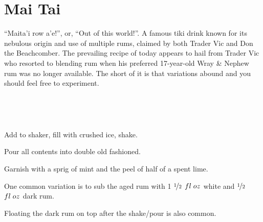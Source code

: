 \section[Mai Tai]{Mai Tai}


\begin{recipestats}[
	servings=1,
	preptime=5 \minute,
	original=\citefield{cocktailSeminars2021}{title} \cite{cocktailSeminars2021},
]
\end{recipestats}


\begin{recipeabstract}
	``Maita'i row a'e!'', or, ``Out of this world!''.
	A famous tiki drink known for its nebulous origin and use of multiple rums, claimed by both Trader Vic and Don the Beachcomber.
	The prevailing recipe of today appears to hail from Trader Vic who resorted to blending rum when his preferred 17-year-old Wray \& Nephew rum was no longer available.
	The short of it is that variations abound and you should feel free to experiment.
\end{recipeabstract}


\begin{ingredientcolumns}
	\begin{ingredientblock}
		\\
	\end{ingredientblock}
	\begin{ingredientblock}
		\ingredient[\onehalf][\fluidounce]{cura\c{c}ao}\\
		\ingredient[\onehalf][\fluidounce]{orgeat}
	\end{ingredientblock}
\end{ingredientcolumns}


\begin{preparation}
\item Add to shaker, fill with crushed ice, shake.
\item Pour all contents into double old fashioned.
\item Garnish with a sprig of mint and the peel of half of a spent lime.
\end{preparation}


\begin{variation}
\item One common variation is to sub the aged rum with 1 $\nicefrac{1}{2}$ $fl\;oz$ white and $\nicefrac{1}{2}$ $fl\;oz$ dark rum.
\item Floating the dark rum on top after the shake/pour is also common.
\end{variation}


\recipeend
